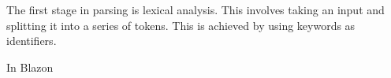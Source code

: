 

The first stage in parsing is lexical analysis.  This involves taking an input and splitting it into a series of tokens.  This is achieved by using keywords as identifiers.  


In Blazon 

